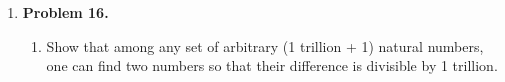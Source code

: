 \documentclass[letterpaper,fleqn]{article}
\begin{document}
\begin{enumerate}
		\item [] \textbf{Problem 16.}
		\begin{enumerate}
			\item [] Show that among any set of arbitrary (1 trillion + 1) natural numbers, one can find two numbers so that their difference is divisible by 1 trillion.
		\end{enumerate}
		
	\end{enumerate}
\end{document}
